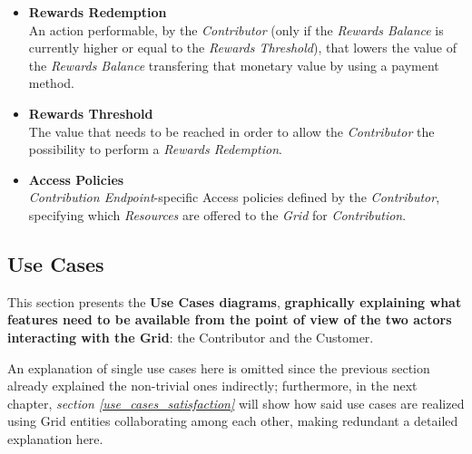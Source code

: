 \begin{itemize}
    \item \textbf{Rewards Redemption}\label{rewards_redemption}\\
    An action performable, by the \textit{Contributor} (only if the \textit{Rewards Balance} is currently higher or equal to the \textit{Rewards Threshold}), that lowers the value of the \textit{Rewards Balance} transfering that monetary value by using a payment method.
    \item \textbf{Rewards Threshold}\label{rewards_threshold}\\
    The value that needs to be reached in order to allow the \textit{Contributor} the possibility to perform a \textit{Rewards Redemption}.
    \item \textbf{Access Policies}\label{access_policies}\\
    \textit{Contribution Endpoint}-specific Access policies defined by the \textit{Contributor}, specifying which \textit{Resources} are offered to the \textit{Grid} for \textit{Contribution}.
\end{itemize}
\vspace{20mm}

\subsection{Use Cases}\label{use_cases}
This section presents the \textbf{Use Cases diagrams}, \textbf{graphically explaining what features need to be available from the point of view of the two actors interacting with the Grid}: the Contributor and the Customer.

An explanation of single use cases here is omitted since the previous section already explained the non-trivial ones indirectly; furthermore, in the next chapter, \textit{section \ref{use_cases_satisfaction}} will show how said use cases are realized using Grid entities collaborating among each other, making redundant a detailed explanation here.

